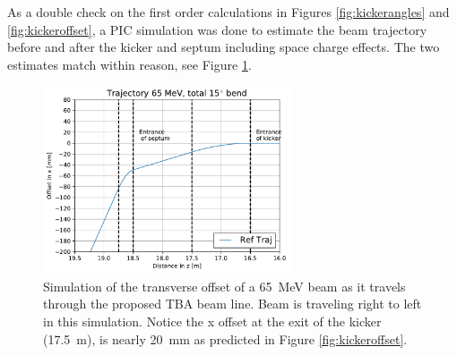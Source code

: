 As a double check on the first order calculations in Figures \ref{fig:kickerangles} and \ref{fig:kickeroffset}, 
a PIC simulation was done to estimate the beam 
trajectory before and after the kicker and septum including space charge effects.
The two estimates match within reason, see Figure \ref{fig:beamtraj}. 
\begin{figure}
	\begin{center}
		\includegraphics[width=0.65\textwidth]{./images/tba_trajectory}
		\caption{Simulation of the transverse offset of a \SI{65}{MeV} beam as 
			it travels through the proposed TBA beam line. 
			Beam is traveling right to left in this simulation. 
			Notice the x offset at the exit of the kicker (\SI{17.5}{m}), 
			is nearly \SI{20}{mm} as predicted in Figure \ref{fig:kickeroffset}.}
		\label{fig:beamtraj}
	\end{center}
\end{figure}


